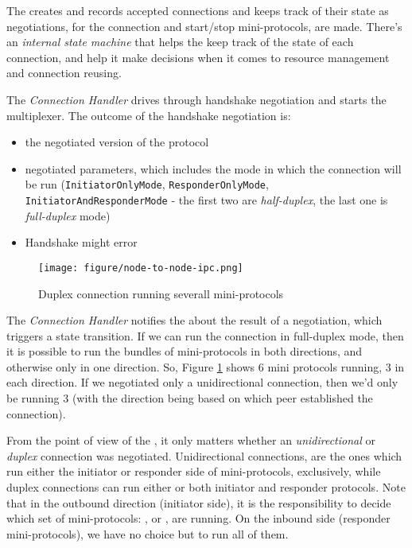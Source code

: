 The \Connmngr{} creates and records accepted connections and keeps track of their state
as negotiations, for the connection and start/stop mini-protocols, are made. There's an
\emph{internal state machine} that helps the \Connmngr{} keep track of the state of each
connection, and help it make decisions when it comes to resource management and
connection reusing.

The \emph{Connection Handler} drives through handshake negotiation and starts the multiplexer. The
outcome of the handshake negotiation is:

\begin{itemize}
    \item the negotiated version of the protocol
    \item negotiated parameters, which includes the mode in which the connection will be
      run (\texttt{InitiatorOnlyMode}, \texttt{ResponderOnlyMode},\\
      \texttt{InitiatorAndResponderMode} - the first two are \emph{half-duplex}, the last
      one is \emph{full-duplex} mode)
    \item Handshake might error
\end{itemize}

\begin{figure}
    \centering
    \texttt{[image: figure/node-to-node-ipc.png]}
    \caption{Duplex connection running severall mini-protocols}
    \label{fig:protocol-diagram}
\end{figure}

The \emph{Connection Handler} notifies the \Connmngr{} about the result of a negotiation, which
triggers a state transition. If we can run the connection in full-duplex mode,
then it is possible to run the bundles of mini-protocols in both directions, and otherwise only in one direction.
So, Figure \ref{fig:protocol-diagram} shows $6$ mini protocols running, $3$ in each direction.
If we negotiated only a unidirectional connection, then we'd only be running $3$
(with the direction being based on which peer established the connection).

From the point of view of the \connmngr{}, it only
matters whether an \emph{unidirectional} or \emph{duplex} connection was negotiated.
Unidirectional connections, are the ones which run either the initiator or responder
side of mini-protocols, exclusively, while duplex connections can run either or
both initiator and responder protocols. Note that in the outbound direction (initiator side),
it is the \ptopgov{} responsibility to decide which set of mini-protocols:
\established{}, \warm{} or \hot{}, are running. On the inbound side (responder
mini-protocols), we have no choice but to run all of them.

